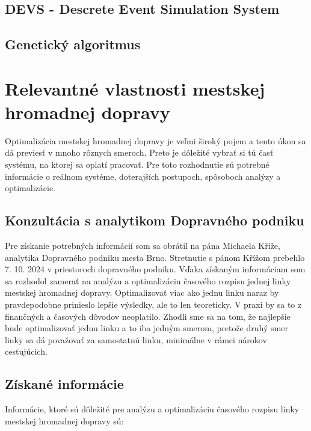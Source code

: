 \section{DEVS - Descrete Event Simulation System}
\section{Genetický algoritmus}

\chapter{Relevantné vlastnosti mestskej hromadnej dopravy} %
\label{relevantne_vlastnosti}

Optimalizácia mestskej hromadnej dopravy je veľmi široký pojem a tento úkon sa dá previesť v mnoho rôznych smeroch.
Preto je dôležité vybrať si tú časť systému, na ktorej sa oplatí pracovať.
Pre toto rozhodnutie sú potrebné informácie o reálnom systéme, doterajších postupoch, spôsoboch analýzy a optimalizácie.

\section{Konzultácia s analytikom Dopravného podniku}
Pre získanie potrebných informácií som sa obrátil na pána Michaela Kříže, analytika Dopravného podniku mesta Brno.
Stretnutie s pánom Křížom prebehlo 7. 10. 2024 v priestoroch dopravného podniku.
Vďaka získaným informáciam som sa rozhodol zamerať na analýzu a optimalizáciu časového rozpisu jednej linky mestskej hromadnej dopravy.
Optimalizovať viac ako jednu linku naraz by pravdepodobne prinieslo lepšie výsledky, ale to len teoreticky.
V praxi by sa to z finančných a časových dôvodov neoplatilo.
Zhodli sme sa na tom, že najlepšie bude optimalizovať jednu linku a to iba jedným smerom, pretože druhý smer linky sa dá považovať za samostatnú linku, minimálne v rámci nárokov cestujúcich.

\section{Získané informácie}

Informácie, ktoré sú dôležité pre analýzu a optimalizáciu časového rozpisu linky mestskej hromadnej dopravy sú:

